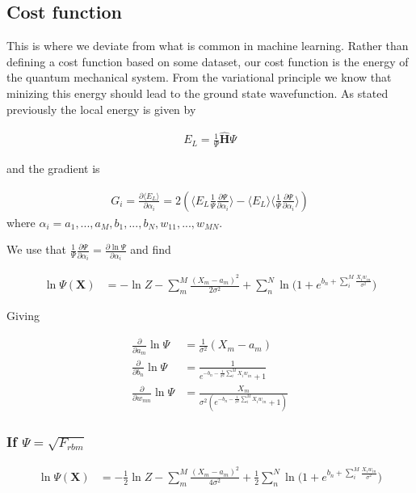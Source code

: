 \documentclass[twoside,english]{uiofysmaster}
\begin{document}
\subsection{Cost function}
This is where we deviate from what is common in machine learning. Rather than defining a cost function based on some dataset, our cost function is the energy of the quantum mechanical system. From the variational principle we know that minizing this energy should lead to the ground state wavefunction. As stated previously the local energy is given by

\begin{align}
	E_L = \frac{1}{\Psi} \hat{\mathbf{H}} \Psi
\end{align}

and the gradient is

\begin{align}
	G_i = \frac{\partial \langle E_L \rangle}{\partial \alpha_i}
	= 2(\langle E_L \frac{1}{\Psi}\frac{\partial \Psi}{\partial \alpha_i} \rangle - \langle E_L \rangle \langle \frac{1}{\Psi}\frac{\partial \Psi}{\partial \alpha_i} \rangle )
\end{align}
where $\alpha_i = a_1,...,a_M,b_1,...,b_N,w_{11},...,w_{MN}$.


We use that $\frac{1}{\Psi}\frac{\partial \Psi}{\partial \alpha_i} 
	= \frac{\partial \ln{\Psi}}{\partial \alpha_i}$
and find

\begin{align}
	\ln{\Psi({\mathbf{X}})} &= -\ln{Z} - \sum_m^M \frac{(X_m - a_m)^2}{2\sigma^2}
	+ \sum_n^N \ln({1 + e^{b_n + \sum_i^M \frac{X_i w_{in}}{\sigma^2}})}
\end{align}

Giving

\begin{align}
	\frac{\partial }{\partial a_m} \ln\Psi
	&= 	\frac{1}{\sigma^2} (X_m - a_m) \\
	\frac{\partial }{\partial b_n} \ln\Psi
	&=
	\frac{1}{e^{-b_n-\frac{1}{\sigma^2}\sum_i^M X_i w_{in}} + 1} \\
	\frac{\partial }{\partial w_{mn}} \ln\Psi
	&= \frac{X_m}{\sigma^2(e^{-b_n-\frac{1}{\sigma^2}\sum_i^M X_i w_{in}} + 1)}
\end{align}

\subsubsection{If $\Psi = \sqrt{F_{rbm}}$}

\begin{align}
	\ln{\Psi({\mathbf{X}})} &= -\frac{1}{2}\ln{Z} - \sum_m^M \frac{(X_m - a_m)^2}{4\sigma^2}
	+ \frac{1}{2}\sum_n^N \ln({1 + e^{b_n + \sum_i^M \frac{X_i w_{in}}{\sigma^2}})}
\end{align}
\end{document}

